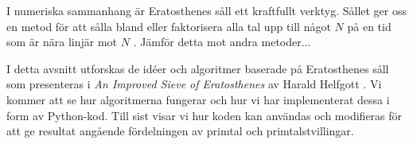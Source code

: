 
I numeriska sammanhang är Eratosthenes såll ett kraftfullt verktyg.
Sållet ger oss en metod för att sålla bland eller faktorisera alla tal upp till något $N$ på en tid som är nära linjär mot $N$ \cite[s. 333]{HaraldSieve}.
Jämför detta mot andra metoder...

I detta avsnitt utforskas de idéer och algoritmer baserade på Eratosthenes såll som presenteras i \textit{An Improved Sieve of Eratosthenes} av Harald Helfgott \cite{HaraldSieve}.
Vi kommer att se hur algoritmerna fungerar och hur vi har implementerat dessa i form av Python-kod.
Till sist visar vi hur koden kan användas och modifieras för att ge resultat angående fördelningen av primtal och primtalstvillingar.



